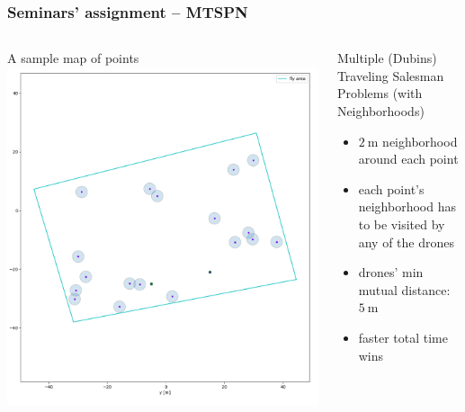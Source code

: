 \documentclass[aspectratio=1610]{beamer}
\newcommand{\unit}[2]{$#1~\ensuremath{\mathrm{#2}}$}
\begin{document}
  \begin{frame}
    \frametitle{Seminars' assignment -- MTSPN}

    \begin{columns}[c]

      \begin{block}{A sample map of points}
        \includegraphics[width=1.0\textwidth]{./fig/tsp_points.png}
      \end{block}

      \begin{block}{Multiple (Dubins) Traveling Salesman Problems (with Neighborhoods)}
        \begin{itemize}
          \item \unit{2}{m} neighborhood around each point
          \item each point's neighborhood has to be visited by any of the drones
          \item drones' min mutual distance: \unit{5}{m}
          \item faster total time wins
        \end{itemize}
      \end{block}


\end{columns}
\end{frame}
\end{document}
